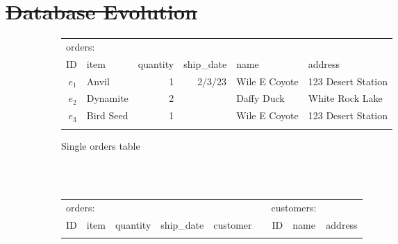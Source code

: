 \documentclass[english,submission]{programming}
\theoremstyle{definition}
\providecommand{\DIFdel}[1]{{\protect\color{red}\sout{#1}}} %
\providecommand{\DIFdelbegin}{} %
\providecommand{\DIFdelend}{} %
\providecommand{\DIFaddbeginFL}{} %
\providecommand{\DIFaddendFL}{} %
\begin{document}
\DIFdelbegin \section{\DIFdel{Database Evolution}}%
\addtocounter{section}{-1}%

\DIFdelend \begin{figure}
  \DIFaddbeginFL \vspace{-8pt}
\DIFaddendFL \begin{subfigure}[b]{35em}\vspace{0pt}
  \sffamily
  \small
  \begin{tabular}{ r|l|r|r|l|l|}
  \multicolumn{2}{l}{orders:}\\
     \hhline{~-----}
     ID & item & quantity & ship\_date & name & address \\
     \hhline{~=====}

     $e_1$ & Anvil & 1 & 2/3/23 & Wile E Coyote & 123 Desert Station \\
     \hhline{~-----}
     $e_2$ & Dynamite & 2 & & Daffy Duck & White Rock Lake \\
     \hhline{~-----}
     $e_3$ & Bird Seed & 1 & & Wile E Coyote & 123 Desert Station \\
     \hhline{~-----}
  \end{tabular}
  \caption{Single orders table}
  \label{fig:tables-single}
\end{subfigure}
\\[-0.5em]~\\
\begin{subfigure}[b]{40em}\vspace{0pt}
  \sffamily
  \small
  \begin{tabular}{ r|l|r|r|r|cr|l|l|}
  \multicolumn{2}{l}{orders:}&\multicolumn{4}{l}{}&\multicolumn{2}{l}{customers:}\\
     \hhline{~----~~--}
     ID & item & quantity & ship\_date & customer && ID & name & address \\
     \hhline{~====~~==}


\end{tabular}
\end{subfigure}
\end{figure}
\end{document}
